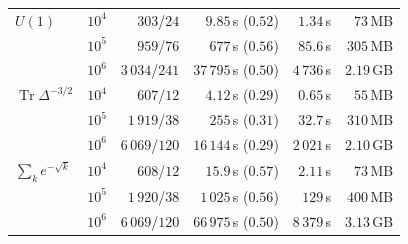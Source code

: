 \documentclass[11pt,reqno]{amsart}
\theoremstyle{definition}
\theoremstyle{remark}
\begin{document}
\begin{table}[tp]
\begin{tabular}{llrrrr}
\midrule
$U(1)$ & $10^4$ & $303$/$24$ & $9.85$\,s ($0.52$) & $1.34$\,s & $73$\,MB \\
 & $10^5$ & $959$/$76$ & $677$\,s ($0.56$) & $85.6$\,s & $305$\,MB \\
 & $10^6$ & $3\,034$/$241$ & $37\,795$\,s ($0.50$) & $4\,736$\,s & $2.19$\,GB \\
\midrule
$\operatorname{Tr}\Delta^{-3/2}$ & $10^4$ & $607$/$12$ & $4.12$\,s ($0.29$) & $0.65$\,s & $55$\,MB \\
 & $10^5$ & $1\,919$/$38$ & $255$\,s ($0.31$) & $32.7$\,s & $310$\,MB \\
 & $10^6$ & $6\,069$/$120$ & $16\,144$\,s ($0.29$) & $2\,021$\,s & $2.10$\,GB \\
\midrule
$\sum_ke^{-\sqrt k}$ & $10^4$ & $608$/$12$ & $15.9$\,s ($0.57$) & $2.11$\,s & $73$\,MB \\
 & $10^5$ & $1\,920$/$38$ & $1\,025$\,s ($0.56$) & $129$\,s & $400$\,MB \\
 & $10^6$ & $6\,069$/$120$ & $66\,975$\,s ($0.50$) & $8\,379$\,s & $3.13$\,GB \\
\bottomrule
\end{tabular}
\end{table}
\end{document}
